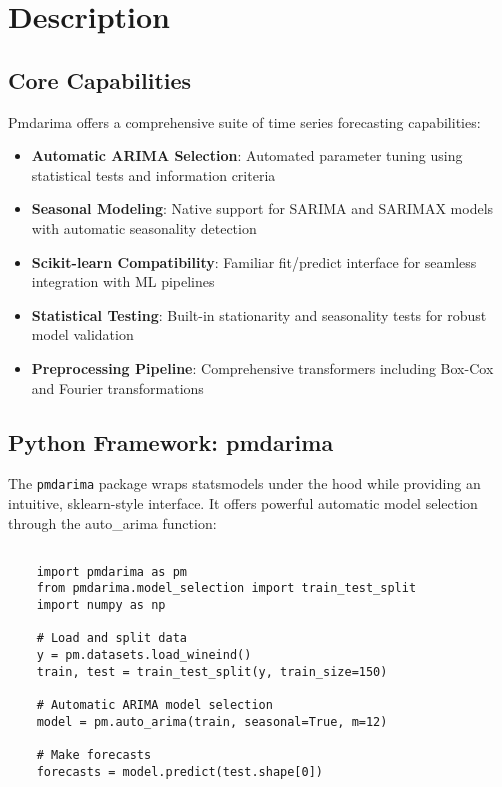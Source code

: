 \section{Description}
\label{sec:description}

\subsection{Core Capabilities}
\label{subsec:capabilities}

Pmdarima offers a comprehensive suite of time series forecasting capabilities:

\begin{itemize}
	\item \textbf{Automatic ARIMA Selection}: Automated parameter tuning using statistical tests and information criteria
	\item \textbf{Seasonal Modeling}: Native support for SARIMA and SARIMAX models with automatic seasonality detection
	\item \textbf{Scikit-learn Compatibility}: Familiar fit/predict interface for seamless integration with ML pipelines
	\item \textbf{Statistical Testing}: Built-in stationarity and seasonality tests for robust model validation
	\item \textbf{Preprocessing Pipeline}: Comprehensive transformers including Box-Cox and Fourier transformations
\end{itemize}

\clearpage

\subsection{Python Framework: pmdarima}
\label{subsec:pmdarima}

The \texttt{pmdarima} package wraps statsmodels under the hood while providing an intuitive, sklearn-style interface. It offers powerful automatic model selection through the auto\_arima function:

\begin{lstlisting}[language=MyPython, caption={Pmdarima Core Functions}, label={lst:pmdarima_core}]
	
	import pmdarima as pm
	from pmdarima.model_selection import train_test_split
	import numpy as np
	
	# Load and split data
	y = pm.datasets.load_wineind()
	train, test = train_test_split(y, train_size=150)
	
	# Automatic ARIMA model selection
	model = pm.auto_arima(train, seasonal=True, m=12)
	
	# Make forecasts
	forecasts = model.predict(test.shape[0])
	
\end{lstlisting}

